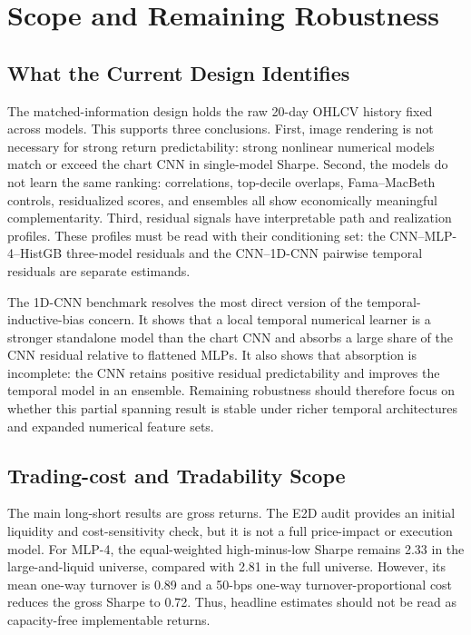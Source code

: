 \section{Scope and Remaining Robustness}
\label{sec:remaining_benchmark}

\subsection{What the Current Design Identifies}

The matched-information design holds the raw 20-day OHLCV history fixed across models. This supports three conclusions. First, image rendering is not necessary for strong return predictability: strong nonlinear numerical models match or exceed the chart CNN in single-model Sharpe. Second, the models do not learn the same ranking: correlations, top-decile overlaps, Fama--MacBeth controls, residualized scores, and ensembles all show economically meaningful complementarity. Third, residual signals have interpretable path and realization profiles. These profiles must be read with their conditioning set: the CNN--MLP-4--HistGB three-model residuals and the CNN--1D-CNN pairwise temporal residuals are separate estimands.

The 1D-CNN benchmark resolves the most direct version of the temporal-inductive-bias concern. It shows that a local temporal numerical learner is a stronger standalone model than the chart CNN and absorbs a large share of the CNN residual relative to flattened MLPs. It also shows that absorption is incomplete: the CNN retains positive residual predictability and improves the temporal model in an ensemble. Remaining robustness should therefore focus on whether this partial spanning result is stable under richer temporal architectures and expanded numerical feature sets.

\subsection{Trading-cost and Tradability Scope}

The main long-short results are gross returns. The E2D audit provides an initial liquidity and cost-sensitivity check, but it is not a full price-impact or execution model. For MLP-4, the equal-weighted high-minus-low Sharpe remains 2.33 in the large-and-liquid universe, compared with 2.81 in the full universe. However, its mean one-way turnover is 0.89 and a 50-bps one-way turnover-proportional cost reduces the gross Sharpe to 0.72. Thus, headline estimates should not be read as capacity-free implementable returns.

